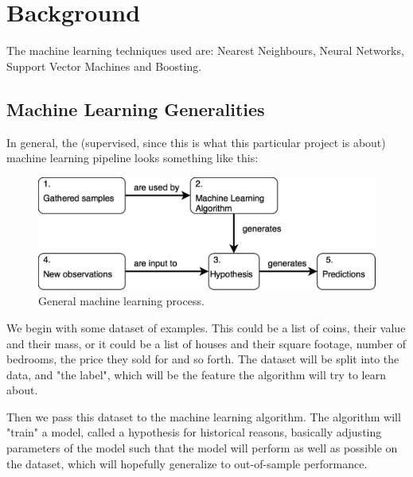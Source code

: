 \documentclass[a4paper, 12pt]{article}
\begin{document}
    \newpage

    \section{Background}

        \par The machine learning techniques used are: Nearest Neighbours, Neural Networks, Support Vector Machines and Boosting.
        
        \subsection{Machine Learning Generalities}
        
            \par In general, the (supervised, since this is what this particular project is about) machine learning pipeline looks something like this:
            
                \begin{figure}[h]
                    \caption{General machine learning process.}
                    \includegraphics[width=\textwidth]{machineLearningGeneralNotion}
                \end{figure}
                
            \par We begin with some dataset of examples. This could be a list of coins, their value and their mass, or it could be a list of houses and their square footage, number of bedrooms, the price they sold for and so forth. The dataset will be split into the data, and "the label", which will be the feature the algorithm will try to learn about. 
            
            \par Then we pass this dataset to the machine learning algorithm. The algorithm will "train" a model, called a hypothesis for historical reasons, basically adjusting parameters of the model such that the model will perform as well as possible on the dataset, which will hopefully generalize to out-of-sample performance. 
            
\end{document}
